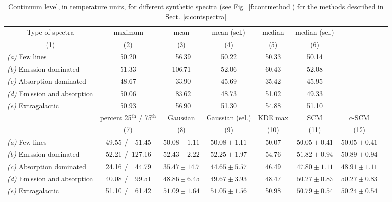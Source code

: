 \documentclass{aa}
\newcommand{\phn} {$\phantom{0}$}
\begin{document}
\begin{table*}
\caption{\label{t:contspectra} Continuum level, in temperature units, for different synthetic spectra (see Fig.~\ref{f:contmethod}) for the methods described in Sect.~\ref{s:contspectra}}
\centering
\begin{tabular}{l c c c c c c c}
\hline\hline

\multicolumn{1}{c}{Type of spectra}
&maximum
&mean
&mean (sel.)
&median
&median (sel.)
\\

\multicolumn{1}{c}{(1)}
&(2)
&(3)
&(4)
&(5)
&(6)
\\
\hline
\textit{(a)} Few lines                &50.20  &\phn56.39  &50.22  &50.33  &50.14  \\
\textit{(b)} Emission dominated       &51.33  &106.71     &52.06  &60.43  &52.08  \\
\textit{(c)} Absorption dominated     &48.67  &\phn33.90  &45.69  &35.42  &45.95  \\
\textit{(d)} Emission and absorption  &50.06  &\phn83.62  &48.73  &51.02  &49.33  \\
\textit{(e)} Extragalactic            &50.93  &\phn56.90  &51.30  &54.88  &51.10  \\
\hline
\multicolumn{1}{c}{}
&percent 25$^\mathrm{th}$ / 75$^\mathrm{th}$
&Gaussian
&Gaussian (sel.)
&KDE max
&SCM
&c-SCM
\\
\multicolumn{1}{c}{}
&(7)
&(8)
&(9)
&(10)
&(11)
&(12)
\\
\hline
\textit{(a)} Few lines                &49.55~/~\phn51.45 &$50.08\pm1.11$  &$50.08\pm1.11$  &50.07  &$50.05\pm0.41$ &$50.05\pm0.41$\\
\textit{(b)} Emission dominated       &52.21~/~127.16    &$52.43\pm2.22$  &$52.25\pm1.97$  &54.76  &$51.82\pm0.94$ &$50.89\pm0.94$\\
\textit{(c)} Absorption dominated     &24.16~/~\phn44.79 &$35.47\pm14.7$  &$44.65\pm5.57$  &46.49  &$47.80\pm1.11$ &$48.91\pm1.11$\\
\textit{(d)} Emission and absorption  &40.08~/~\phn99.51 &$48.86\pm6.45$  &$49.67\pm3.93$  &48.47  &$50.27\pm0.83$ &$50.27\pm0.83$\\
\textit{(e)} Extragalactic            &51.10~/~\phn61.42 &$51.09\pm1.64$  &$51.05\pm1.56$  &50.98  &$50.79\pm0.54$ &$50.24\pm0.54$\\
\hline
\end{tabular}
\end{table*}
\end{document}
